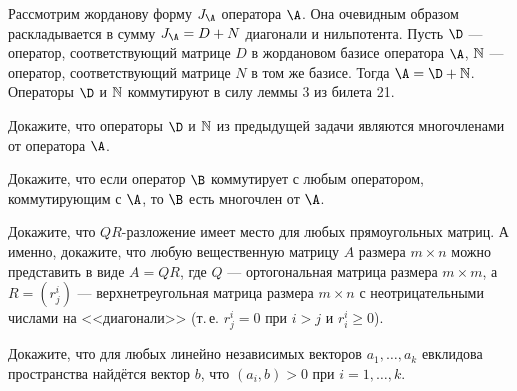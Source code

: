 \begin{solution}
    Рассмотрим жорданову форму $J_\A$ оператора $\A$. Она очевидным образом раскладывается в сумму $J_\A = D + N$ диагонали и нильпотента. Пусть $\D$ --- оператор, соответствующий матрице $D$ в жордановом базисе оператора $\A$, $\N$ --- оператор, соответствующий матрице $N$ в том же базисе. Тогда $\A = \D + \N$. Операторы $\D$ и $\N$ коммутируют в силу леммы 3 из билета 21.
\end{solution}

\begin{problem}
    Докажите, что операторы $\D$ и $\N$ из предыдущей задачи являются многочленами от оператора $\A$.
\end{problem}

\renewcommand{\N}{\mathbb{N}}

\begin{problem}
    Докажите, что если оператор $\B$ коммутирует с любым оператором, коммутирующим с $\A$, то $\B$ есть многочлен от $\A$.
\end{problem}

\begin{problem}
    Докажите, что $QR$-разложение имеет место для любых прямоугольных матриц. А именно, докажите, что любую вещественную матрицу $A$ размера $m \times n$ можно представить в виде $A = QR$, где $Q$ --- ортогональная матрица размера $m \times m$, а $R = (r^i_j)$ --- верхнетреугольная матрица размера $m \times n$ с неотрицательными числами на <<диагонали>> (т.\,е. $r^i_j = 0$ при $i > j$ и $r^i_i \geqslant 0$).
\end{problem}

\begin{problem}
    Докажите, что для любых линейно независимых векторов $a_1, \ldots, a_k$ евклидова пространства найдётся вектор $b$, что $(a_i, b) > 0$ при $i = 1, \ldots, k$.
\end{problem}

